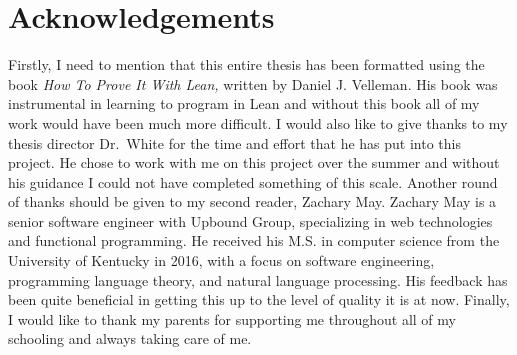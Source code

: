 \documentclass[
  letterpaper,
]{scrreprt}
\renewcommand*\contentsname{Table of contents}
\newcommand\contentsname{Table of contents}
\theoremstyle{remark}
\begin{document}
\newenvironment{ndfn}[1]
  {\renewcommand{\defnm}{#1}\begin{nameddfn}}
  {\end{nameddfn}}

\newenvironment{npf}[1]
  {\begin{proof}[#1]}
  {\end{proof}}


\let\oldgreater\textgreater
\renewcommand{\textgreater}{\null\oldgreater}   %

\ifdefined\Shaded\renewenvironment{Shaded}{\begin{tcolorbox}[interior hidden, borderline west={3pt}{0pt}{shadecolor}, breakable, enhanced, frame hidden, sharp corners, boxrule=0pt]}{\end{tcolorbox}}\fi

\renewcommand*\contentsname{Table of contents}
{
\hypersetup{linkcolor=}
\setcounter{tocdepth}{1}
\tableofcontents
}

\hypertarget{acknowledgements}{%
\chapter*{Acknowledgements}\label{acknowledgements}}



Firstly, I need to mention that this entire thesis has been formatted
using the book \emph{How To Prove It With Lean,} written by Daniel J.
Velleman. His book was instrumental in learning to program in Lean and
without this book all of my work would have been much more difficult. I
would also like to give thanks to my thesis director Dr.~White for the
time and effort that he has put into this project. He chose to work with
me on this project over the summer and without his guidance I could not
have completed something of this scale. Another round of thanks should
be given to my second reader, Zachary May. Zachary May is a senior
software engineer with Upbound Group, specializing in web technologies
and functional programming. He received his M.S. in computer science
from the University of Kentucky in 2016, with a focus on software
engineering, programming language theory, and natural language
processing. His feedback has been quite beneficial in getting this up to
the level of quality it is at now. Finally, I would like to thank my
parents for supporting me throughout all of my schooling and always
taking care of me.
\end{document}
